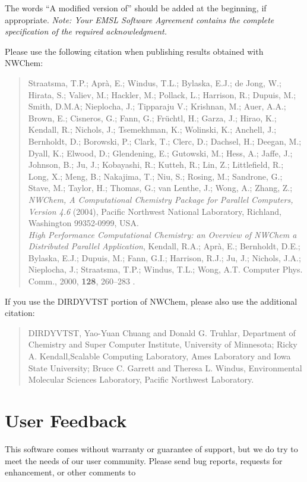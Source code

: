 The words ``A modified version of'' should be added at the beginning,
if appropriate.  {\em Note: Your EMSL Software Agreement contains the
complete specification of the required acknowledgment.}

Please use the following citation when publishing results obtained
with NWChem:
\begin{quote}
Straatsma, T.P.; Apr\`a, E.; Windus, T.L.; Bylaska, E.J.; de Jong, W.;
Hirata, S.; Valiev, M.; Hackler, M.; Pollack, L.; Harrison, R.;
Dupuis, M.; Smith, D.M.A; Nieplocha, J.; Tipparaju V.; Krishnan, M.;
Auer, A.A.; Brown, E.; Cisneros, G.; Fann, G.; Fr\"uchtl, H.; Garza, J.;
Hirao, K.; Kendall, R.; Nichols, J.; Tsemekhman, K.; Wolinski, K.;
Anchell, J.; Bernholdt, D.; Borowski, P.; Clark, T.; Clerc, D.;
Dachsel, H.; Deegan, M.; Dyall, K.; Elwood, D.; Glendening, E.;
Gutowski, M.; Hess, A.; Jaffe, J.; Johnson, B.; Ju, J.; Kobayashi, R.;
Kutteh, R.; Lin, Z.; Littlefield, R.; Long, X.; Meng, B.; Nakajima,
T.; Niu, S.; Rosing, M.; Sandrone, G.; Stave, M.; Taylor, H.; Thomas,
G.; van Lenthe, J.; Wong, A.; Zhang, Z.; {\em NWChem, A Computational
Chemistry Package for Parallel Computers, Version 4.6} (2004),
Pacific Northwest National Laboratory, Richland, Washington
99352-0999, USA. \\
{\em High Performance Computational Chemistry: an Overview of NWChem a
Distributed Parallel Application}, Kendall, R.A.; Apr\`a, E.;
Bernholdt, D.E.; Bylaska, E.J.; Dupuis, M.; Fann, G.I.; Harrison,
R.J.;  Ju, J.; Nichols, J.A.; Nieplocha, J.; Straatsma, T.P.; Windus,
T.L.; Wong, A.T. Computer Phys. Comm., 2000, {\bf 128}, 260--283 .
\end{quote}

If you use the DIRDYVTST portion of NWChem, please also use the additional
citation:
\begin{quote}
  DIRDYVTST, Yao-Yuan Chuang and Donald G. Truhlar,
  Department of Chemistry and Super Computer Institute,
  University of Minnesota; Ricky A. Kendall,Scalable Computing Laboratory,
  Ames Laboratory and Iowa State University; Bruce C. Garrett and Theresa L. 
  Windus, Environmental Molecular Sciences Laboratory, Pacific Northwest 
  Laboratory.
\end{quote}

\section{User Feedback}

This software comes without warranty or guarantee of support,
but we do try to meet the needs of our user community.  Please send bug
reports, requests for enhancement, or other comments to

